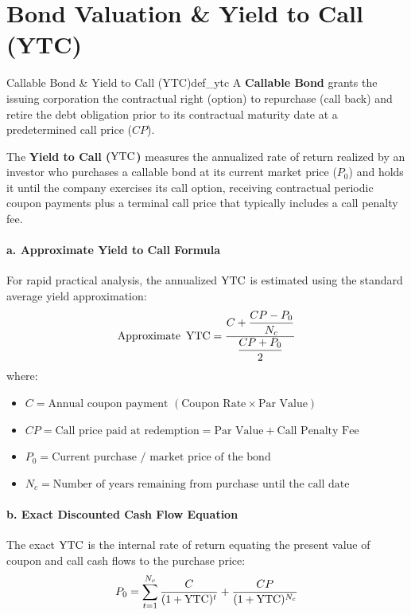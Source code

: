 \section{Bond Valuation \& Yield to Call (YTC)}

\begin{definition}{Callable Bond \& Yield to Call (YTC)}{def_ytc}
A \textbf{Callable Bond} grants the issuing corporation the contractual right (option) to repurchase (call back) and retire the debt obligation prior to its contractual maturity date at a predetermined call price ($CP$).

The \textbf{Yield to Call ($\operatorname{YTC}$)} measures the annualized rate of return realized by an investor who purchases a callable bond at its current market price ($P_0$) and holds it until the company exercises its call option, receiving contractual periodic coupon payments plus a terminal call price that typically includes a call penalty fee.
\end{definition}

\begin{formulabox}
\paragraph{a. Approximate Yield to Call Formula}
For rapid practical analysis, the annualized $\operatorname{YTC}$ is estimated using the standard average yield approximation:
\begin{equation}
    \text{Approximate } \operatorname{YTC} = \frac{C + \dfrac{CP - P_0}{N_c}}{\dfrac{CP + P_0}{2}}
\end{equation}
where:
\begin{itemize}[noitemsep]
    \item $C = \text{Annual coupon payment } (\text{Coupon Rate} \times \text{Par Value})$
    \item $CP = \text{Call price paid at redemption} = \text{Par Value} + \text{Call Penalty Fee}$
    \item $P_0 = \text{Current purchase / market price of the bond}$
    \item $N_c = \text{Number of years remaining from purchase until the call date}$
\end{itemize}

\vspace{0.3em}
\paragraph{b. Exact Discounted Cash Flow Equation}
The exact $\operatorname{YTC}$ is the internal rate of return equating the present value of coupon and call cash flows to the purchase price:
\begin{equation}
    P_0 = \sum_{t=1}^{N_c} \frac{C}{(1 + \operatorname{YTC})^t} + \frac{CP}{(1 + \operatorname{YTC})^{N_c}}
\end{equation}
\end{formulabox}

